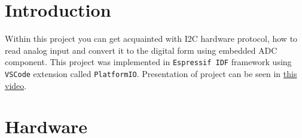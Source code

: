 \documentclass[a4paper, 11pt, twocolumn]{article}
\begin{document}

\section{Introduction}

Within this project you can get acquainted with I2C hardware protocol, how to read analog input and convert it to the digital form using embedded ADC component. This project was implemented in \texttt{Espressif IDF} framework using \texttt{VSCode} extension called \texttt{PlatformIO}. Presentation of project can be seen in \href{https://youtu.be/JHA2dlhXHdE}{this video}.

\vspace{-0.5cm}
\section{Hardware}
\end{document}
